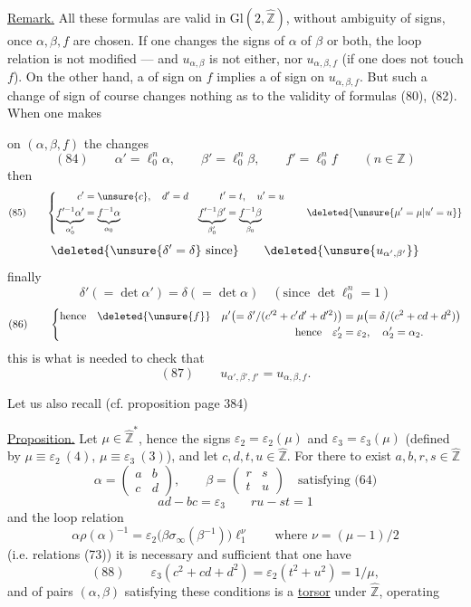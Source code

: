 \uline{Remark.} All these formulas are valid in $\mathrm{Gl}(2,\widehat{\mathbb Z})$, without ambiguity of signs, once $\alpha,\beta,f$ are chosen. If one changes the signs of $\alpha$  of $\beta$ or both, the loop relation is not modified --- and $u_{\alpha,\beta}$ is not  either,  nor $u_{\alpha,\beta,f}$ (if one does not touch $f$). On the other hand, a  of sign on $f$ implies a  of sign on $u_{\alpha,\beta,f}$. But such a change of sign of course changes nothing as to the validity of formulas (80), (82). When one makes


on $(\alpha,\beta,f)$ the changes 
\[
(84)\qquad
\alpha'=\ell_0^n\alpha,\qquad\beta'=\ell_0^n\beta,\qquad f'=\ell_0^n f
\qquad(n\in\mathbb Z)
\]
then 
\[
(85)\qquad
\left\{\begin{aligned}
c'&=\unsure{c},\quad d'=d& t'&=t,\quad u'=u\\
\underbrace{f'^{-1}\alpha'}_{\alpha'_0}&=\underbrace{f^{-1}\alpha}_{\alpha_0}&
\underbrace{f'^{-1}\beta'}_{\beta'_0}&=\underbrace{f^{-1}\beta}_{\beta_0}
\end{aligned}\right.
\qquad\deleted{\unsure{\mu'=\mu|u'=u}}
\]
\[
\deleted{\unsure{\delta'=\delta}\text{ since}}
\qquad\deleted{\unsure{u_{\alpha',\beta'}}}
\]
finally
\[
\delta'(=\det\alpha')=\delta(=\det\alpha)\quad(\text{since }\det \ell_0^n=1)
\]
\[
(86)\qquad
\left\{\begin{aligned}
\text{hence}\quad\deleted{\unsure{f}}\quad
\mu'\bigl(=\delta'/(c'^2+c'd'+d'^2)\bigr)&=\mu\bigl(=\delta/(c^2+cd+d^2)\bigr)\\
\text{hence}\quad\varepsilon'_2&=\varepsilon_2,\quad\alpha'_2=\alpha_2.
\end{aligned}\right.
\]
this is  what is needed to check  that
\[
(87)\qquad u_{\alpha',\beta',f'}=u_{\alpha,\beta,f}.
\]

Let us also recall (cf. proposition page 384)

\uline{Proposition.} Let $\mu\in\widehat{\mathbb Z}^*$, hence the signs $\varepsilon_2=\varepsilon_2(\mu)$ and $\varepsilon_3=\varepsilon_3(\mu)$ (defined by $\mu\equiv\varepsilon_2\ (4)$, $\mu\equiv\varepsilon_3\ (3)$), and let $c,d,t,u\in\widehat{\mathbb Z}$. For there to exist $a,b,r,s\in\widehat{\mathbb Z}$
\[
\alpha=\begin{pmatrix}a&b\\c&d\end{pmatrix},\qquad
\beta=\begin{pmatrix}r&s\\t&u\end{pmatrix}
\quad\text{satisfying (64)}
\]
\[
ad-bc=\varepsilon_3\qquad ru-st=1
\]
and the loop relation
\[
\alpha\rho(\alpha)^{-1}=\varepsilon_2\bigl(\beta\sigma_\infty(\beta^{-1})\bigr)\ell_1^\nu
\qquad\text{where }\nu=(\mu-1)/2
\]
(i.e. relations (73)) it is necessary and sufficient that one have
\[
(88)\qquad\varepsilon_3(c^2+cd+d^2)=\varepsilon_2(t^2+u^2)=1/\mu,
\]
and  of pairs $(\alpha,\beta)$ satisfying these conditions is a \uline{torsor} under $\widehat{\mathbb Z}$, operating

